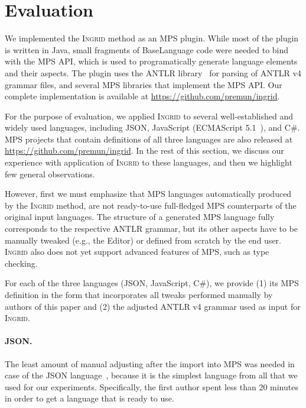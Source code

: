 \section{Evaluation}
\label{sect:EVAL}

We implemented the \textsc{Ingrid} method as an MPS plugin.
While most of the plugin is written in Java, small fragments of BaseLanguage code were needed to bind with the MPS API, which is used to programatically generate language elements and their aspects.
The plugin uses the ANTLR library~\cite{ref:ANTLR} for parsing of ANTLR v4 grammar files, and several MPS libraries that implement the MPS API.
Our complete implementation is available at \url{https://github.com/premun/ingrid}.

For the purpose of evaluation, we applied \textsc{Ingrid} to several well-established and widely used languages, including JSON, JavaScript (ECMAScript 5.1~\cite{ref:ECMASCRIPT51}), and C\#.
MPS projects that contain definitions of all three languages are also released at \url{https://github.com/premun/ingrid}.
In the rest of this section, we discuss our experience with application of \textsc{Ingrid} to these languages, and then we highlight few general observations.

However, first we must emphasize that MPS languages automatically produced by the \textsc{Ingrid} method, are not ready-to-use full-fledged MPS counterparts of the original input languages.
The structure of a generated MPS language fully corresponds to the respective ANTLR grammar, but its other aspects have to be manually tweaked (e.g., the Editor) or defined from scratch by the end user.
\textsc{Ingrid} also does not yet support advanced features of MPS, such as type checking.

For each of the three languages (JSON, JavaScript, C\#), we provide (1) its MPS definition in the form that incorporates all tweaks performed manually by authors of this paper and (2) the adjusted ANTLR v4 grammar used as input for \textsc{Ingrid}.

\paragraph{JSON.}
The least amount of manual adjusting after the import into MPS was needed in case of the JSON language~\cite{ref:JSON}, because it is the simplest language from all that we used for our experiments.
Specifically, the first author spent less than 20 minutes in order to get a language that is ready to use.


